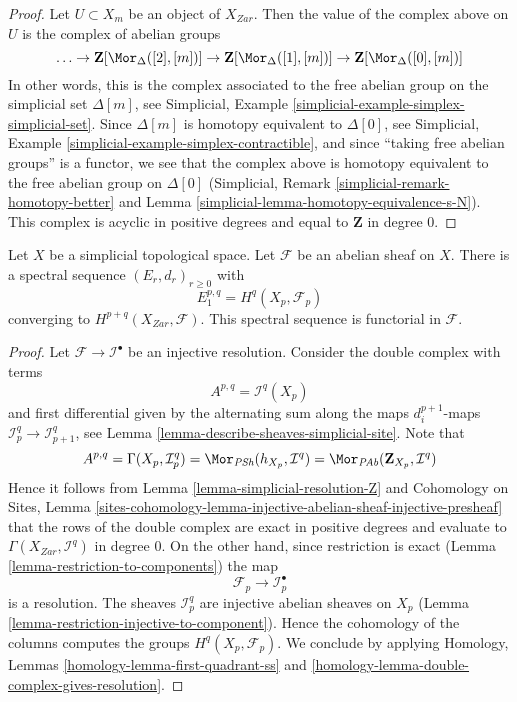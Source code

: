 \begin{proof}
Let $U \subset X_m$ be an object of $X_{Zar}$. Then the value of
the complex above on $U$ is the complex of abelian groups
$$
\ldots \to
\mathbf{Z}[\Mor_\Delta([2], [m])] \to
\mathbf{Z}[\Mor_\Delta([1], [m])] \to
\mathbf{Z}[\Mor_\Delta([0], [m])]
$$
In other words, this is the complex associated to the
free abelian group on the simplicial set $\Delta[m]$, see
Simplicial, Example \ref{simplicial-example-simplex-simplicial-set}.
Since $\Delta[m]$ is homotopy equivalent to $\Delta[0]$, see
Simplicial, Example \ref{simplicial-example-simplex-contractible},
and since ``taking free abelian groups'' is a functor,
we see that the complex above is homotopy equivalent to
the free abelian group on $\Delta[0]$
(Simplicial, Remark \ref{simplicial-remark-homotopy-better} and
Lemma \ref{simplicial-lemma-homotopy-equivalence-s-N}).
This complex is acyclic in positive degrees
and equal to $\mathbf{Z}$ in degree $0$.
\end{proof}

\begin{lemma}
\label{lemma-simplicial-sheaf-cohomology}
Let $X$ be a simplicial topological space. Let $\mathcal{F}$ be an abelian
sheaf on $X$. There is a spectral sequence $(E_r, d_r)_{r \geq 0}$ with
$$
E_1^{p, q} = H^q(X_p, \mathcal{F}_p)
$$
converging to $H^{p + q}(X_{Zar}, \mathcal{F})$.
This spectral sequence is functorial in $\mathcal{F}$.
\end{lemma}

\begin{proof}
Let $\mathcal{F} \to \mathcal{I}^\bullet$ be an injective resolution.
Consider the double complex with terms
$$
A^{p, q} = \mathcal{I}^q(X_p)
$$
and first differential given by the alternating sum along the maps
$d^{p + 1}_i$-maps $\mathcal{I}_p^q \to \mathcal{I}_{p + 1}^q$, see
Lemma \ref{lemma-describe-sheaves-simplicial-site}. Note that
$$
A^{p, q} = \Gamma(X_p, \mathcal{I}_p^q) =
\Mor_{\textit{PSh}}(h_{X_p}, \mathcal{I}^q) =
\Mor_{\textit{PAb}}(\mathbf{Z}_{X_p}, \mathcal{I}^q)
$$
Hence it follows from Lemma \ref{lemma-simplicial-resolution-Z} and
Cohomology on Sites, Lemma
\ref{sites-cohomology-lemma-injective-abelian-sheaf-injective-presheaf}
that the rows of the double complex are exact in positive degrees and
evaluate to $\Gamma(X_{Zar}, \mathcal{I}^q)$ in degree $0$.
On the other hand, since restriction is exact
(Lemma \ref{lemma-restriction-to-components})
the map
$$
\mathcal{F}_p \to \mathcal{I}_p^\bullet
$$
is a resolution. The sheaves $\mathcal{I}_p^q$ are injective
abelian sheaves on $X_p$
(Lemma \ref{lemma-restriction-injective-to-component}).
Hence the cohomology of the columns computes the groups
$H^q(X_p, \mathcal{F}_p)$. We conclude by applying
Homology, Lemmas \ref{homology-lemma-first-quadrant-ss} and
\ref{homology-lemma-double-complex-gives-resolution}.
\end{proof}

